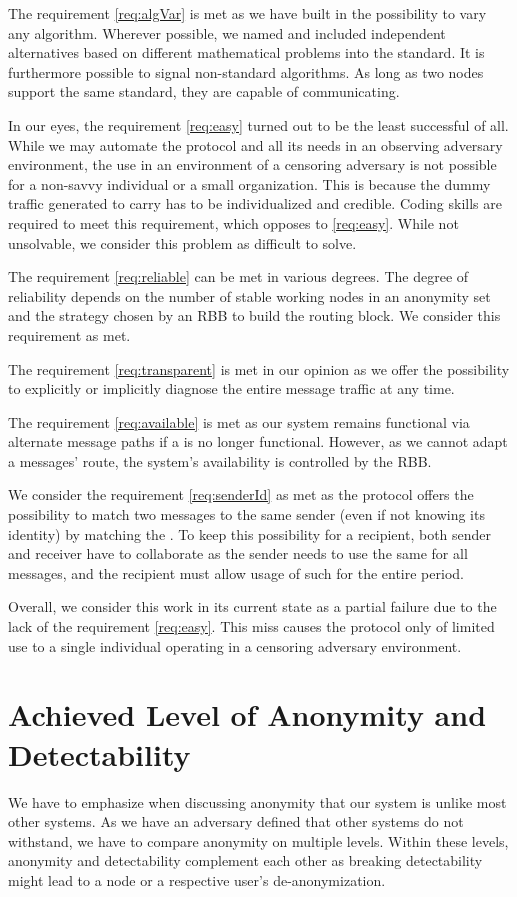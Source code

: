 The requirement \ref{req:algVar} is met as we have built in the possibility to vary any algorithm. Wherever possible, we named and included independent alternatives based on different mathematical problems into the standard. It is furthermore possible to signal non-standard algorithms. As long as two nodes support the same standard, they are capable of communicating.

In our eyes, the requirement \ref{req:easy} turned out to be the least successful of all. While we may automate the \MessageVortex{} protocol and all its needs in an observing adversary environment, the use in an environment of a censoring adversary is not possible for a non-savvy individual or a small organization. This is because the dummy traffic generated to carry \VortexMessages{} has to be individualized and credible. Coding skills are required to meet this requirement, which opposes to \ref{req:easy}. While not unsolvable, we consider this problem as difficult to solve.

The requirement \ref{req:reliable} can be met in various degrees. The degree of reliability depends on the number of stable working nodes in an anonymity set and the strategy chosen by an RBB to build the routing block. We consider this requirement as met. 

The requirement \ref{req:transparent} is met in our opinion as we offer the possibility to explicitly or implicitly diagnose the entire message traffic at any time. 

The requirement \ref{req:available} is met as our system remains functional via alternate message paths if a \VortexNode{} is no longer functional. However, as we cannot adapt a messages' route, the system's availability is controlled by the RBB.

We consider the requirement \ref{req:senderId} as met as the protocol offers the possibility to match two messages to the same sender (even if not knowing its identity) by matching the . To keep this possibility for a recipient, both sender and receiver have to collaborate as the sender needs to use the same  for all messages, and the recipient must allow usage of such  for the entire period.

Overall, we consider this work in its current state as a partial failure due to the lack of the requirement \ref{req:easy}. This miss causes the protocol only of limited use to a single individual operating in a censoring adversary environment.

\section{Achieved Level of Anonymity and Detectability}
We have to emphasize when discussing anonymity that our system is unlike most other systems. As we have an adversary defined that other systems do not withstand, we have to compare anonymity on multiple levels. Within these levels, anonymity and detectability complement each other as breaking detectability might lead to a node or a respective user's de-anonymization. 

